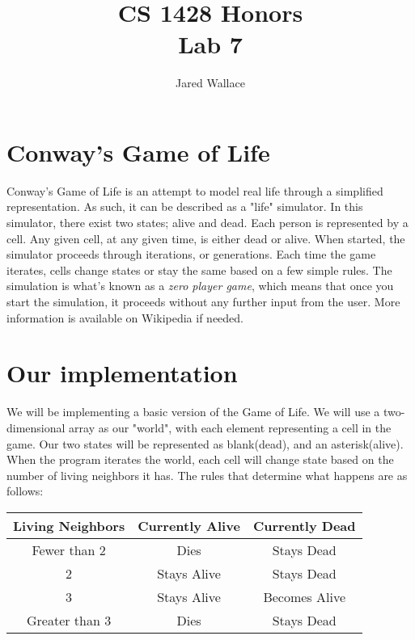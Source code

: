 \documentclass[letterpaper,12pt]{article}
\title{\Large CS 1428 Honors\\Lab 7}
\author{Jared Wallace}
\date{}
\begin{document}
\maketitle

\vspace{30mm}

\section*{Conway's Game of Life}
Conway's Game of Life is an attempt to model real life through a simplified representation.
As such, it can be described as a "life" simulator. In this simulator, there exist two states;
alive and dead. Each person is represented by a cell. Any given cell, at any given time, is either
dead or alive. When started, the simulator proceeds through iterations, or generations. Each time
the game iterates, cells change states or stay the same based on a few simple rules.
The simulation is what's known as a \emph{zero player game}, which means that once you start the
simulation, it proceeds without any further input from the user.
More information is available on Wikipedia if needed.

\section*{Our implementation}
We will be implementing a basic version of the Game of Life. We will use a two-dimensional array as
our "world", with each element representing a cell in the game. Our two states will be represented as
blank(dead), and an asterisk(alive). When the program iterates the world, each cell will change state
based on the number of living neighbors it has. The rules that determine what happens are as follows:
\begin{table}[H]
\begin{center}
    \begin{tabular}{|c|c|c|}
        \hline
        \textbf{Living Neighbors} & \textbf{Currently Alive} & \textbf{Currently Dead} \\ \hline
        Fewer than 2 & Dies & Stays Dead \\ \hline
        2 & Stays Alive & Stays Dead \\ \hline
        3 & Stays Alive & Becomes Alive \\ \hline
        Greater than 3 & Dies & Stays Dead \\ \hline
    \end{tabular}
\end{center}
\end{table}
\end{document}
